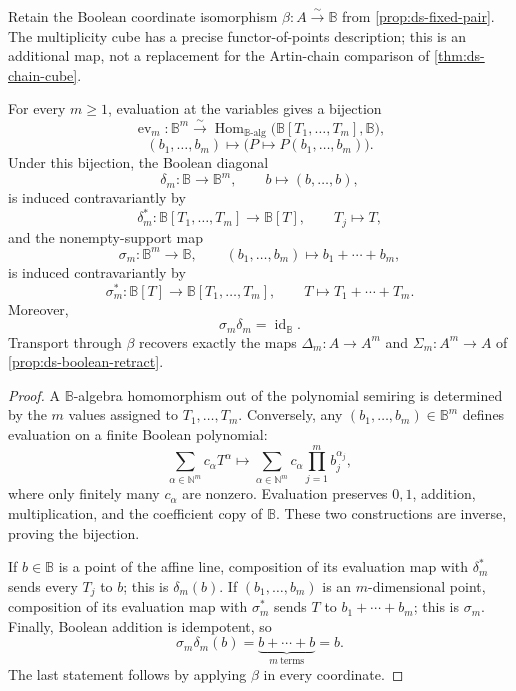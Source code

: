 Retain the Boolean coordinate isomorphism
\(\beta:A\overset{\sim}{\longrightarrow}\mathbb B\) from
\cref{prop:ds-fixed-pair}.  The multiplicity cube has a precise functor-of-points
description; this is an additional map, not a replacement for the Artin-chain
comparison of \cref{thm:ds-chain-cube}.

\begin{proposition}
\label{prop:phase-boolean-affine-points}
For every \(m\geq1\), evaluation at the variables gives a bijection
\[
 \operatorname{ev}_m:
 \mathbb B^m
 \overset{\sim}{\longrightarrow}
 \operatorname{Hom}_{\mathbb B\text{-alg}}
 \bigl(\mathbb B[T_1,\ldots,T_m],\mathbb B\bigr),
\]
\[
 (b_1,\ldots,b_m)\longmapsto
 \bigl(P\longmapsto P(b_1,\ldots,b_m)\bigr).
\]
Under this bijection, the Boolean diagonal
\[
 \delta_m:\mathbb B\longrightarrow\mathbb B^m,
 \qquad b\longmapsto(b,\ldots,b),
\]
is induced contravariantly by
\[
 \delta_m^*:
 \mathbb B[T_1,\ldots,T_m]\longrightarrow\mathbb B[T],
 \qquad T_j\longmapsto T,
\]
and the nonempty-support map
\[
 \sigma_m:\mathbb B^m\longrightarrow\mathbb B,
 \qquad
 (b_1,\ldots,b_m)\longmapsto b_1+\cdots+b_m,
\]
is induced contravariantly by
\[
 \sigma_m^*:
 \mathbb B[T]\longrightarrow\mathbb B[T_1,\ldots,T_m],
 \qquad
 T\longmapsto T_1+\cdots+T_m.
\]
Moreover,
\[
 \sigma_m\delta_m=\operatorname{id}_{\mathbb B}.
\]
Transport through \(\beta\) recovers exactly the maps
\(\Delta_m:A\to A^m\) and \(\Sigma_m:A^m\to A\) of
\cref{prop:ds-boolean-retract}.
\end{proposition}

\begin{proof}
A \(\mathbb B\)-algebra homomorphism out of the polynomial semiring is
determined by the \(m\) values assigned to \(T_1,\ldots,T_m\).  Conversely, any
\((b_1,\ldots,b_m)\in\mathbb B^m\) defines evaluation on a finite Boolean
polynomial:
\[
  \sum_{\alpha\in\mathbb N^m}c_\alpha T^\alpha
  \longmapsto
  \sum_{\alpha\in\mathbb N^m}c_\alpha
  \prod_{j=1}^m b_j^{\alpha_j},
\]
where only finitely many \(c_\alpha\) are nonzero.
Evaluation preserves \(0,1\), addition, multiplication, and the coefficient
copy of \(\mathbb B\).  These two constructions are inverse, proving the
bijection.

If \(b\in\mathbb B\) is a point of the affine line, composition of its evaluation
map with \(\delta_m^*\) sends every \(T_j\) to \(b\); this is \(\delta_m(b)\).
If \((b_1,\ldots,b_m)\) is an \(m\)-dimensional point, composition of its
evaluation map with \(\sigma_m^*\) sends \(T\) to
\(b_1+\cdots+b_m\); this is \(\sigma_m\).  Finally, Boolean addition is
idempotent, so
\[
 \sigma_m\delta_m(b)=\underbrace{b+\cdots+b}_{m\ \mathrm{terms}}=b.
\]
The last statement follows by applying \(\beta\) in every coordinate.
\end{proof}

